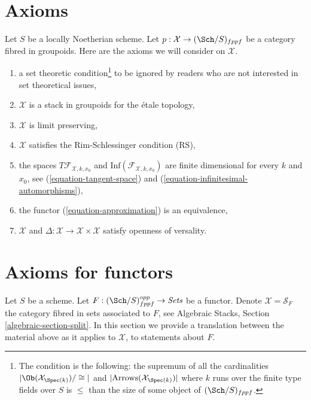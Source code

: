 \section{Axioms}
\label{artin-section-axioms}
Let $S$ be a locally Noetherian scheme. Let
$p : \mathcal{X} \to (\Sch/S)_{fppf}$ be a category fibred in groupoids.
Here are the axioms we will consider on $\mathcal{X}$.
\begin{enumerate}
\item[{[-1]}] a set theoretic condition\footnote{The condition is the
following: the supremum of all the cardinalities
$|\Ob(\mathcal{X}_{\Spec(k)})/\cong|$ and
$|\text{Arrows}(\mathcal{X}_{\Spec(k)})|$ where $k$ runs over the finite
type fields over $S$ is $\leq$ than the size of some
object of $(\Sch/S)_{fppf}$.} to be ignored by
readers who are not interested in set theoretical issues,
\item[{[0]}] $\mathcal{X}$ is a stack in groupoids for the \'etale topology,
\item[{[1]}] $\mathcal{X}$ is limit preserving,
\item[{[2]}] $\mathcal{X}$ satisfies the Rim-Schlessinger condition (RS),
\item[{[3]}] the spaces $T\mathcal{F}_{\mathcal{X}, k, x_0}$ and
$\text{Inf}(\mathcal{F}_{\mathcal{X}, k, x_0})$
are finite dimensional
for every $k$ and $x_0$, see
(\ref{equation-tangent-space}) and
(\ref{equation-infinitesimal-automorphisms}),
\item[{[4]}] the functor (\ref{equation-approximation}) is an equivalence,
\item[{[5]}] $\mathcal{X}$ and
$\Delta : \mathcal{X} \to \mathcal{X} \times \mathcal{X}$ satisfy
openness of versality.
\end{enumerate}

\section{Axioms for functors}
\label{artin-section-axioms-functors}
Let $S$ be a scheme. Let $F : (\Sch/S)_{fppf}^{opp} \to \textit{Sets}$ be a
functor. Denote $\mathcal{X} = \mathcal{S}_F$ the category fibred in sets
associated to $F$, see Algebraic Stacks, Section \ref{algebraic-section-split}.
In this section we provide a translation between the material above
as it applies to $\mathcal{X}$, to statements about $F$.

